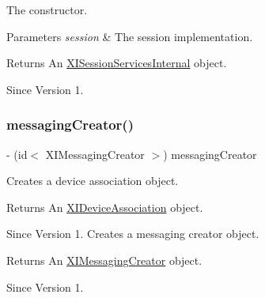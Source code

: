 The constructor. 


\begin{DoxyParams}{Parameters}
{\em session} & The session implementation. \\
\hline
\end{DoxyParams}
\begin{DoxyReturn}{Returns}
An \hyperlink{interface_x_i_session_services_internal}{X\+I\+Session\+Services\+Internal} object. 
\end{DoxyReturn}
\begin{DoxySince}{Since}
Version 1. 
\end{DoxySince}
\hypertarget{interface_x_i_session_services_internal_abee8df637626cbc07de4f7a3d254efbe}{}\label{interface_x_i_session_services_internal_abee8df637626cbc07de4f7a3d254efbe} 
\subsubsection{\texorpdfstring{messaging\+Creator()}{messagingCreator()}}
{\footnotesize\ttfamily -\/ (id$<$ X\+I\+Messaging\+Creator $>$) messaging\+Creator \begin{DoxyParamCaption}{ }\end{DoxyParamCaption}}



Creates a device association object. 

\begin{DoxyReturn}{Returns}
An \hyperlink{class_x_i_device_association-p}{X\+I\+Device\+Association} object. 
\end{DoxyReturn}
\begin{DoxySince}{Since}
Version 1. Creates a messaging creator object. 
\end{DoxySince}
\begin{DoxyReturn}{Returns}
An \hyperlink{class_x_i_messaging_creator-p}{X\+I\+Messaging\+Creator} object. 
\end{DoxyReturn}
\begin{DoxySince}{Since}
Version 1. 
\end{DoxySince}
\hypertarget{interface_x_i_session_services_internal_a1f4dff26e7d2c196d5c71f98abff19de}{}\label{interface_x_i_session_services_internal_a1f4dff26e7d2c196d5c71f98abff19de} 
